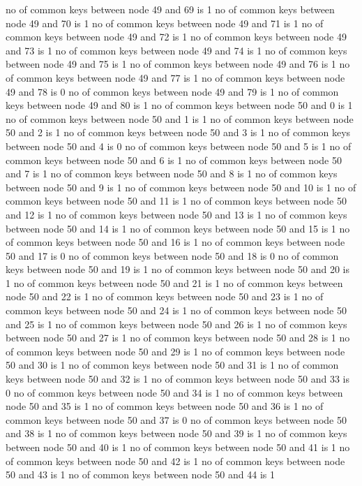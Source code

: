 no of common keys between node 49 and 69 is 1
no of common keys between node 49 and 70 is 1
no of common keys between node 49 and 71 is 1
no of common keys between node 49 and 72 is 1
no of common keys between node 49 and 73 is 1
no of common keys between node 49 and 74 is 1
no of common keys between node 49 and 75 is 1
no of common keys between node 49 and 76 is 1
no of common keys between node 49 and 77 is 1
no of common keys between node 49 and 78 is 0
no of common keys between node 49 and 79 is 1
no of common keys between node 49 and 80 is 1
no of common keys between node 50 and 0 is 1
no of common keys between node 50 and 1 is 1
no of common keys between node 50 and 2 is 1
no of common keys between node 50 and 3 is 1
no of common keys between node 50 and 4 is 0
no of common keys between node 50 and 5 is 1
no of common keys between node 50 and 6 is 1
no of common keys between node 50 and 7 is 1
no of common keys between node 50 and 8 is 1
no of common keys between node 50 and 9 is 1
no of common keys between node 50 and 10 is 1
no of common keys between node 50 and 11 is 1
no of common keys between node 50 and 12 is 1
no of common keys between node 50 and 13 is 1
no of common keys between node 50 and 14 is 1
no of common keys between node 50 and 15 is 1
no of common keys between node 50 and 16 is 1
no of common keys between node 50 and 17 is 0
no of common keys between node 50 and 18 is 0
no of common keys between node 50 and 19 is 1
no of common keys between node 50 and 20 is 1
no of common keys between node 50 and 21 is 1
no of common keys between node 50 and 22 is 1
no of common keys between node 50 and 23 is 1
no of common keys between node 50 and 24 is 1
no of common keys between node 50 and 25 is 1
no of common keys between node 50 and 26 is 1
no of common keys between node 50 and 27 is 1
no of common keys between node 50 and 28 is 1
no of common keys between node 50 and 29 is 1
no of common keys between node 50 and 30 is 1
no of common keys between node 50 and 31 is 1
no of common keys between node 50 and 32 is 1
no of common keys between node 50 and 33 is 0
no of common keys between node 50 and 34 is 1
no of common keys between node 50 and 35 is 1
no of common keys between node 50 and 36 is 1
no of common keys between node 50 and 37 is 0
no of common keys between node 50 and 38 is 1
no of common keys between node 50 and 39 is 1
no of common keys between node 50 and 40 is 1
no of common keys between node 50 and 41 is 1
no of common keys between node 50 and 42 is 1
no of common keys between node 50 and 43 is 1
no of common keys between node 50 and 44 is 1

